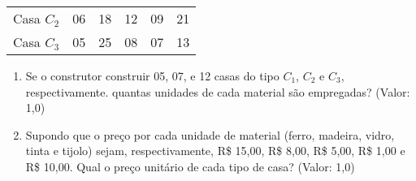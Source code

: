 \documentclass[12pt,a4paper]{article}
\begin{document}
\begin{enumerate}
\begin{center}
\begin{tabular}{cccccc}
Casa $ C_2 $ & 06 & 18 & 12 & 09 & 21 \\

Casa $ C_3 $ & 05 & 25 & 08 & 07 & 13 

\end{tabular} \end{center}

\begin{enumerate}
\item Se o construtor construir 05, 07, e 12 casas do tipo $ C_1 $, $ C_2 $ e $ C_3 $, respectivamente. quantas unidades de cada material são empregadas? (Valor: 1,0)
\item Supondo que o preço por cada unidade de material (ferro, madeira, vidro, tinta e tijolo) sejam, respectivamente, R\$ 15,00, R\$ 8,00, R\$ 5,00, R\$  1,00 e R\$ 10,00. Qual o preço unitário de cada tipo de casa? (Valor: 1,0)
\end{enumerate}


\end{enumerate}
\end{document}
